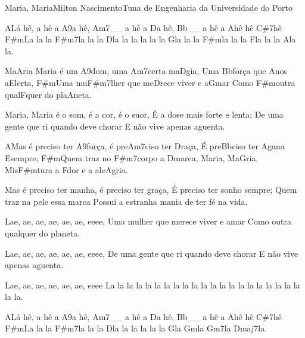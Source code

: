 \begin{musica}{Maria, Maria}{Milton Nascimento}{Tuna de Engenharia da Universidade do Porto}

\ac{A}{Lá} hê, a hê a \ac{A9}{a} hê, \ac{Am7}{}__ a hê a \ac{D}{a} hê, \ac{Bb}{}__ a hê a \ac{A}{hê} hê \ac{C#7}{hê}
\ac{F#m}{La} la la \ac{F#m7}{la} la la \ac{D}{la} la la la la la \ac{G}{la} la la \ac{F#m}{la} la la \ac{F}{la} la la \ac{A}{la} la.

Ma\ac{A}{ria} Maria é um \ac{A9}{dom}, uma \ac{Am7}{cer}ta ma\ac{D}{gia},
Uma \ac{Bb}{for}ça que \ac{A}{nos} a\ac{E}{ler}ta,
\ac{F#m}{U}ma mu\ac{F#m7}{lher} que me\ac{D}{re}ce viver e a\ac{G}{mar}
Como \ac{F#m}{ou}tra qual\ac{F}{quer} do pla\ac{A}{ne}ta.

Maria, Maria é o som, é a cor, é o suor,
É a dose mais forte e lenta;
De uma gente que ri quando deve chorar
E não vive apenas aguenta.


\ac{A}{Mas} é preciso ter \ac{A9}{for}ça, é pre\ac{Am7}{ci}so ter \ac{D}{ra}ça,
É pre\ac{Bb}{ci}so ter \ac{A}{ga}na \ac{E}{sem}pre;
\ac{F#m}{Quem} traz no \ac{F#m7}{cor}po a \ac{D}{mar}ca, Maria, Ma\ac{G}{ria},
Mis\ac{F#m}{tu}ra a \ac{F}{dor} e a ale\ac{A}{gri}a.

Mas é preciso ter manha, é preciso ter graça,
É preciso ter sonho sempre;
Quem traz na pele essa marca
Possui a estranha mania de ter fé na vida.

Lae, ae, ae, ae, ae, ae, eeee,
Uma mulher que merece viver e amar
Como outra qualquer do planeta.

Lae, ae, ae, ae, ae, ae, eeee,
De uma gente que ri quando deve chorar
E não vive apenas aguenta.

 Lae, ae, ae, ae, ae, ae, eeee\nota{,}
La la la la la la la la la la la la la la la la la la la la la la la.

\ac{A}{Lá} hê, a hê a \ac{A9}{a} hê, \ac{Am7}{}__ a hê a \ac{D}{a} hê, \ac{Bb}{}__ a hê a \ac{A}{hê} hê \ac{C#7}{hê}
\ac{F#m}{La} la la \ac{F#m7}{la} la la \ac{D}{la} la la la la la \ac{G}{la} \ac{Gm}{la} \ac{Gm7}{la} \ac{Dmaj7}{la}.

\end{musica}
